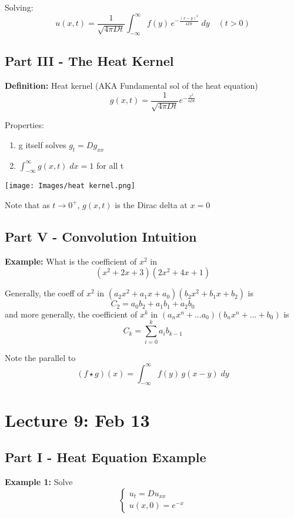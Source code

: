 \documentclass[12pt]{article}
\newcommand{\ans}[1]{\boxed{\text{#1}}}
\begin{document}
Solving:
\[\ans{$u(x, t) = \frac{1}{\sqrt{4\pi Dt}} \int_{-\infty}^\infty f(y)\, e^{-\frac{(x - y)^2}{4Dt}}\; dy$} \quad (t > 0)\]

\subsection*{Part III - The Heat Kernel}
\textbf{Definition:} Heat kernel (AKA Fundamental sol of the heat equation)
\[g(x, t) = \frac{1}{\sqrt{4\pi Dt}}e^{-\frac{x^2}{4Dt}}\]

Properties:
\begin{enumerate}
    \item g itself solves $g_t = Dg_{xx}$
    \item $\int_{-\infty}^\infty g(x, t) \; dx = 1$ for all t 
\end{enumerate}

\texttt{[image: Images/heat kernel.png]}

Note that as $t \to 0^+$, $g(x, t)$ is the Dirac delta at $x = 0$

\subsection*{Part V - Convolution Intuition}
\textbf{Example:} What is the coefficient of $x^2$ in 
\[(x^2 + 2x + 3)(2x^2 + 4x + 1)\]

Generally, the coeff of $x^2$ in $(a_2x^2 + a_1x + a_0)(b_2x^2+ b_1x + b_2)$ is 
\[C_2 = a_0 b_2 + a_1 b_1 + a_2 b_0\] 
and more generally, the coefficient of $x^k$ in $(a_nx^n + ... a_0)(b_nx^n + ... + b_0)$ is 
\[C_k = \sum_{i=0}^k a_i b_{k-1}\]

Note the parallel to 
\[(f \star g)(x) = \int_{-\infty}^\infty f(y)\, g(x -y) \; dy\]

\section{Lecture 9: Feb 13}
\subsection*{Part I - Heat Equation Example}
\textbf{Example 1:} Solve 
\[\begin{cases}
    u_t = Du_{xx}\\
    u(x, 0) = e^{-x}
\end{cases}\]
\end{document}

